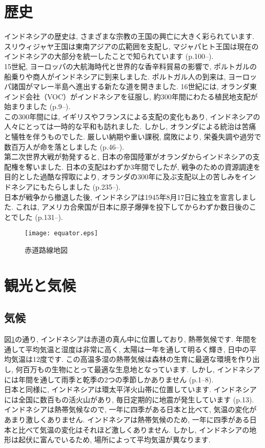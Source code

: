 \documentclass[a4j, twocolumn]{jarticle}
\begin{document}
  \section{歴史}
  インドネシアの歴史は, さまざまな宗教の王国の興亡に大きく彩られています. スリウィジャヤ王国は東南アジアの広範囲を支配し, マジャパヒト王国は現在のインドネシアの大部分を統一したことで知られています\cite{kemdikbud2017sejarahX} (p.100--).\\
  15世紀, ヨーロッパの大航海時代と世界的な香辛料貿易の影響で, ポルトガルの船乗りや商人がインドネシアに到来しました. ポルトガル人の到来は, ヨーロッパ諸国がマレー半島へ進出する新たな道を開きました. 16世紀には, オランダ東インド会社（VOC）がインドネシアを征服し, 約300年間にわたる植民地支配が始まりました\cite{kemdikbud2017sejarahXI} (p.9--).\\
  この300年間には, イギリスやフランスによる支配の変化もあり, インドネシアの人々にとっては一時的な平和も訪れました. しかし, オランダによる統治は苦痛と犠牲を伴うものでした. 厳しい納期や重い課税, 腐敗により, 栄養失調や過労で数百万人が命を落としました\cite{kemdikbud2017sejarahXI} (p.46--).\\
  第二次世界大戦が勃発すると, 日本の帝国陸軍がオランダからインドネシアの支配権を奪いました. 日本の支配はわずか3年間でしたが, 戦争のための資源調達を目的とした過酷な搾取により, オランダの300年に及ぶ支配以上の苦しみをインドネシアにもたらしました\cite{kemdikbud2017sejarahXI} (p.235--). \\
  日本が戦争から撤退した後, インドネシアは1945年8月17日に独立を宣言しました. これは, アメリカ合衆国が日本に原子爆弾を投下してからわずか数日後のことでした\cite{safitry2021sejarah} (p.131--).

  \begin{figure}
    \centering
    \texttt{[image: equator.eps]}
    \caption{赤道路線地図}\label{equator}
  \end{figure}
  \section{観光と気候}
  \subsection{気候}
  図\ref{equator}の通り, インドネシアは赤道の真ん中に位置しており, 熱帯気候です. 年間を通して平均気温と湿度は非常に高く, 太陽は一年を通して明るく輝き, 日中の平均気温は12度です. この高温多湿の熱帯気候は森林の生育に最適な環境を作り出し, 何百万もの生物にとって最適な生息地となっています. しかし, インドネシアには年間を通して雨季と乾季の2つの季節しかありません\cite{handoyo2021geografi} (p.1--8). \\
  日本と同様に, インドネシアは環太平洋火山帯に位置しています. インドネシアには全国に数百もの活火山があり, 毎日定期的に地震が発生しています\cite{handoyo2021geografi} (p.13).\\
  インドネシアは熱帯気候なので, 一年に四季がある日本と比べて, 気温の変化があまり激しくありません. インドネシアは熱帯気候のため, 一年に四季がある日本と比べて気温の変化はそれほど激しくありません. しかし, インドネシアの地形は起伏に富んでいるため, 場所によって平均気温が異なります\cite{intrepid2023weather}.\\
\end{document}
